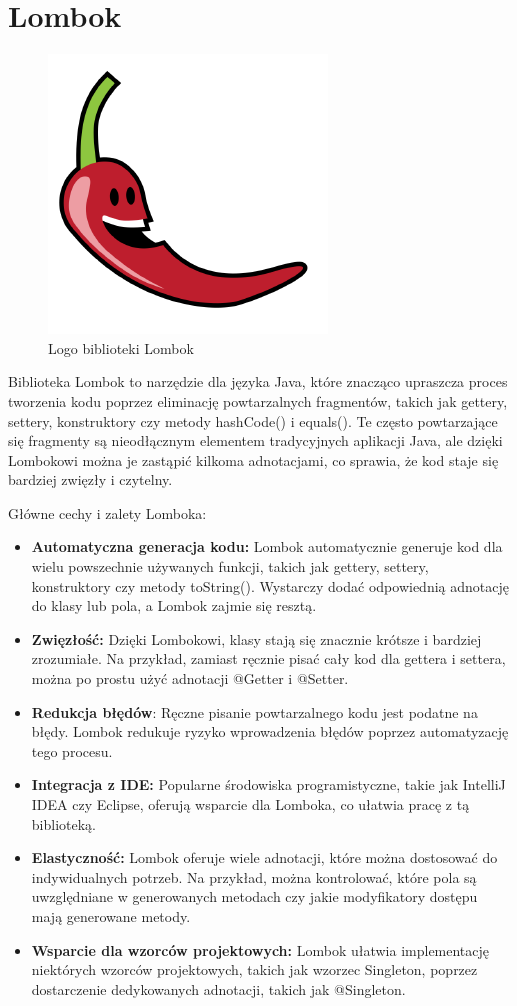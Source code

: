 \section{Lombok}
\begin{figure}[h]
    \centering
    \includegraphics[width=0.4\linewidth]{./img/lombok.png}
    \caption{Logo biblioteki Lombok}
    \label{fig:Lombok}
\end{figure}
Biblioteka Lombok to narzędzie dla języka Java, które znacząco upraszcza proces tworzenia kodu poprzez eliminację powtarzalnych fragmentów, takich jak gettery, settery, konstruktory czy metody hashCode() i equals(). Te często powtarzające się fragmenty są nieodłącznym elementem tradycyjnych aplikacji Java, ale dzięki Lombokowi można je zastąpić kilkoma adnotacjami, co sprawia, że kod staje się bardziej zwięzły i czytelny.

Główne cechy i zalety Lomboka:

\begin{itemize}
\item \textbf{Automatyczna generacja kodu:} Lombok automatycznie generuje kod dla wielu powszechnie używanych funkcji, takich jak gettery, settery, konstruktory czy metody toString(). Wystarczy dodać odpowiednią adnotację do klasy lub pola, a Lombok zajmie się resztą.

\item \textbf{Zwięzłość:} Dzięki Lombokowi, klasy stają się znacznie krótsze i bardziej zrozumiałe. Na przykład, zamiast ręcznie pisać cały kod dla gettera i settera, można po prostu użyć adnotacji @Getter i @Setter.

\item \textbf{Redukcja błędów}: Ręczne pisanie powtarzalnego kodu jest podatne na błędy. Lombok redukuje ryzyko wprowadzenia błędów poprzez automatyzację tego procesu.

\item \textbf{Integracja z IDE:} Popularne środowiska programistyczne, takie jak IntelliJ IDEA czy Eclipse, oferują wsparcie dla Lomboka, co ułatwia pracę z tą biblioteką.

\item \textbf{Elastyczność:} Lombok oferuje wiele adnotacji, które można dostosować do indywidualnych potrzeb. Na przykład, można kontrolować, które pola są uwzględniane w generowanych metodach czy jakie modyfikatory dostępu mają generowane metody.

\item \textbf{Wsparcie dla wzorców projektowych:} Lombok ułatwia implementację niektórych wzorców projektowych, takich jak wzorzec Singleton, poprzez dostarczenie dedykowanych adnotacji, takich jak @Singleton.
\end{itemize}

